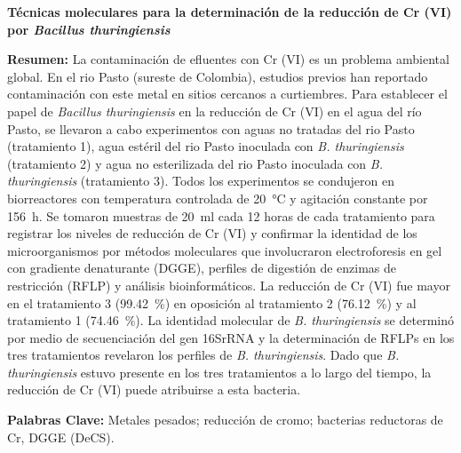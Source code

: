 \documentclass{univsciauth}
\begin{document}
\begin{shaded*}
        {\fontsize{11}{10}\selectfont\textbf{\textcolor{myseccolor}{Técnicas moleculares para
        la determinación de la reducción de Cr (VI) por \emph{Bacillus thuringiensis}}}}

        \vspace{3mm}

        {\fontsize{11}{10}\selectfont\textbf{\textcolor{myseccolor}{Resumen:}}}
        La contaminación de efluentes con Cr (VI) es un problema ambiental global. En el rio Pasto
        (sureste de Colombia), estudios previos han reportado contaminación con este metal en
        sitios cercanos a curtiembres. Para establecer el papel de \emph{Bacillus thuringiensis} en la
        reducción de Cr (VI) en el agua del río Pasto, se llevaron a cabo experimentos con aguas
        no tratadas del rio Pasto (tratamiento 1), agua estéril del rio Pasto inoculada con
        \emph{B. thuringiensis} (tratamiento 2) y agua no esterilizada del rio Pasto inoculada con
        \emph{B. thuringiensis} (tratamiento 3). Todos los experimentos se condujeron en biorreactores con
        temperatura controlada de \SI{20}{\celsius} y agitación constante por \SI{156}{h}. Se tomaron muestras de
        \SI{20}{ml} cada 12 horas de cada tratamiento para registrar los niveles de reducción de Cr (VI)
        y confirmar la identidad de los microorganismos por métodos moleculares que
        involucraron electroforesis en gel con gradiente denaturante (DGGE), perfiles de digestión
        de enzimas de restricción (RFLP) y análisis bioinformáticos. La reducción de Cr (VI) fue
        mayor en el tratamiento 3 (\SI{99.42}{\%}) en oposición al tratamiento 2 (\SI{76.12}{\%}) y al
        tratamiento 1 (\SI{74.46}{\%}). La identidad molecular de \emph{B. thuringiensis} se determinó por
        medio de secuenciación del gen 16SrRNA y la determinación de RFLPs en los tres
        tratamientos revelaron los perfiles de \emph{B. thuringiensis}. Dado que \emph{B. thuringiensis} estuvo
        presente en los tres tratamientos a lo largo del tiempo, la reducción de Cr (VI) puede
        atribuirse a esta bacteria.

        {\fontsize{11}{10}\selectfont\textbf{\textcolor{myseccolor}{Palabras Clave:}}} 
        Metales pesados; reducción de cromo; bacterias reductoras de Cr, DGGE
        (DeCS).
\end{shaded*}
\end{document}
